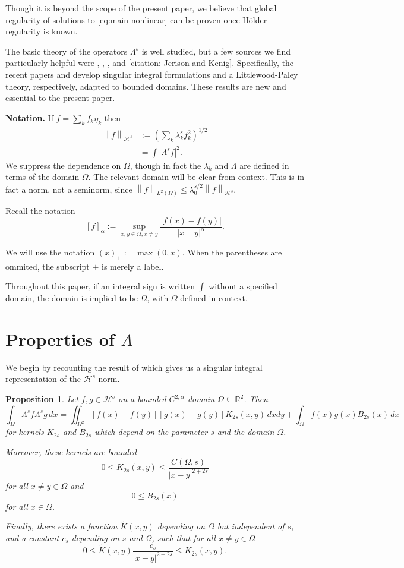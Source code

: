 \documentclass[11pt]{amsart}
\newtheorem{proposition}[theorem]{Proposition}
\theoremstyle{remark}
\theoremstyle{definition}
\newcommand{\R}{\mathbb{R}}
\newcommand{\norm}[1]{\left\lVert#1\right\rVert}
\newcommand{\paren}[1]{\left( #1 \right)}
\newcommand{\bracket}[1]{\left[ #1 \right]}
\newcommand{\abs}[1]{\left\lvert #1 \right\rvert}
\newcommand{\eigen}[1]{\eta_{#1}} %
\newcommand{\HD}{\mathcal{H}}
\newcommand{\HDint}[2]{\int \abs{\Lambda^{#1} #2}^2}
\begin{document}
Though it is beyond the scope of the present paper, we believe that global regularity of solutions to \eqref{eq:main nonlinear} can be proven once H\"{o}lder regularity is known.  

The basic theory of the operators $\Lambda^s$ is well studied, but a few sources we find particularly helpful were \cite{CoIg.fraclap}, \cite{CaSt}, \cite{IMTb}, and [citation: Jerison and Kenig].  Specifically, the recent papers \cite{CaSt} and \cite{IMTb} develop singular integral formulations and a Littlewood-Paley theory, respectively, adapted to bounded domains.  These results are new and essential to the present paper.  

\textbf{Notation.}
If $f = \sum_k f_k \eigen{k}$ then
\begin{align*} 
\norm{f}_{\HD^s} &:= \paren{\sum_k \lambda_k^{s} f_k^2}^{1/2} 
\\ &= \HDint{s}{f}. 
\end{align*}
We suppress the dependence on $\Omega$, though in fact the $\lambda_k$ and $\Lambda$ are defined in terms of the domain $\Omega$.  The relevant domain will be clear from context.  This is in fact a norm, not a seminorm, since $\norm{f}_{L^2(\Omega)} \leq \lambda_0^{s/2} \norm{f}_{\HD^s}$.  

Recall the notation
\[ \bracket{f}_\alpha := \sup_{x,y \in \Omega, x \neq y} \frac{|f(x)-f(y)|}{|x-y|^\alpha}. \]

We will use the notation $(x)_+ := \max(0,x)$.  When the parentheses are ommited, the subscript $+$ is merely a label.  

Throughout this paper, if an integral sign is written $\int$ without a specified domain, the domain is implied to be $\Omega$, with $\Omega$ defined in context.  


\section{Properties of $\Lambda$} \label{sec:lemmas}

We begin by recounting the result of \cite{CaSt} which gives us a singular integral representation of the $\HD^s$ norm.  
\begin{proposition} \label{thm:Caff Stinga representation}
Let $f,g \in \HD^{s}$ on a bounded $C^{2,\alpha}$ domain $\Omega \subseteq \R^2$.  Then
\[ \int_\Omega \Lambda^s f \Lambda^s g \,dx = \iint_{\Omega^2} [f(x)-f(y)][g(x)-g(y)] K_{2s}(x,y) \,dxdy + \int_{\Omega} f(x) g(x) B_{2s}(x) \,dx \]
for kernels $K_{2s}$ and $B_{2s}$ which depend on the parameter $s$ and the domain $\Omega$.  

Moreover, these kernels are bounded
\[ 0 \leq K_{2s}(x,y) \leq \frac{C(\Omega,s)}{|x-y|^{2+2s}} \]
for all $x \neq y \in \Omega$ and
\[ 0 \leq B_{2s}(x) \]
for all $x \in \Omega$.  

Finally, there exists a function $\tilde{K}(x,y)$ depending on $\Omega$ but independent of $s$, and a constant $c_s$ depending on $s$ and $\Omega$, such that for all $x\neq y \in \Omega$
\[ 0 \leq \tilde{K}(x,y) \frac{c_s}{|x-y|^{2+2s}} \leq K_{2s}(x,y). \]
\end{proposition}
\end{document}
